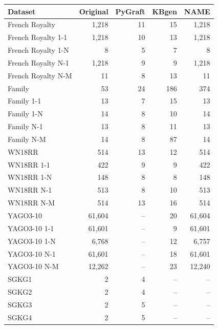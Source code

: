 \begin{tabular}{lrrrr}
\toprule
Dataset & Original & PyGraft & KBgen & NAME \\
\midrule
French Royalty & 1{,}218 & 11 & 15 & 1{,}218 \\
French Royalty 1-1 & 1{,}218 & 10 & 13 & 1{,}218 \\
French Royalty 1-N & 8 & 5 & 7 & 8 \\
French Royalty N-1 & 1{,}218 & 9 & 9 & 1{,}218 \\
French Royalty N-M & 11 & 8 & 13 & 11 \\
\midrule
Family & 53 & 24 & 186 & 374 \\
Family 1-1 & 13 & 7 & 15 & 13 \\
Family 1-N & 14 & 8 & 10 & 14 \\
Family N-1 & 13 & 8 & 11 & 13 \\
Family N-M & 14 & 8 & 87 & 14 \\
\midrule
WN18RR & 514 & 13 & 12 & 514 \\
WN18RR 1-1 & 422 & 9 & 9 & 422 \\
WN18RR 1-N & 148 & 8 & 8 & 148 \\
WN18RR N-1 & 513 & 8 & 10 & 513 \\
WN18RR N-M & 514 & 13 & 16 & 514 \\
\midrule
YAGO3-10 & 61{,}604 & – & 20 & 61{,}604 \\
YAGO3-10 1-1 & 61{,}601 & – & 9 & 61{,}601 \\
YAGO3-10 1-N & 6{,}768 & – & 12 & 6{,}757 \\
YAGO3-10 N-1 & 61{,}601 & – & 18 & 61{,}601 \\
YAGO3-10 N-M & 12{,}262 & – & 23 & 12{,}240 \\
\midrule
SGKG1 & 2 & 4 & – & – \\
SGKG2 & 2 & 4 & – & – \\
SGKG3 & 2 & 5 & – & – \\
SGKG4 & 2 & 5 & – & – \\
\bottomrule
\end{tabular}
